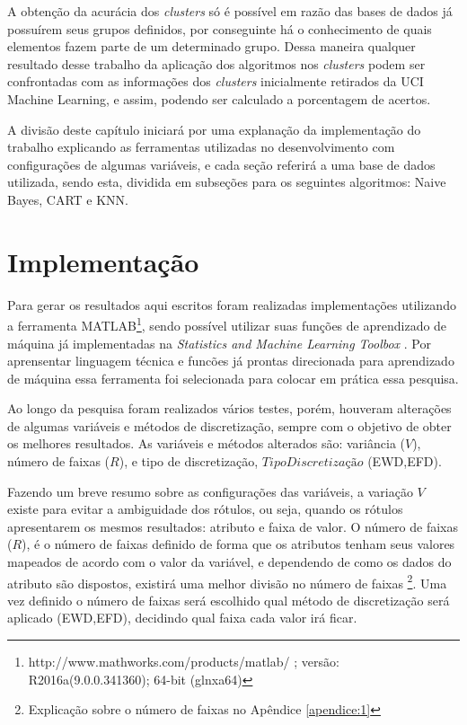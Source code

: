 A obtenção da acurácia dos \textit{clusters} só é possível em razão das bases de dados já possuírem seus grupos definidos, por conseguinte há o conhecimento de quais elementos fazem parte de um determinado grupo. Dessa maneira qualquer resultado desse trabalho da aplicação dos algoritmos nos \textit{clusters} podem ser confrontadas com as informações dos \textit{clusters} inicialmente retirados da UCI Machine Learning, e assim, podendo ser calculado a porcentagem de acertos.

A divisão deste capítulo iniciará por uma explanação da implementação do trabalho explicando as ferramentas  utilizadas no desenvolvimento com configurações  de algumas variáveis, e cada seção referirá a uma base de dados utilizada, sendo esta, dividida em subseções para os seguintes algoritmos: Naive Bayes, CART e KNN.

\section{Implementação}\label{cap:resultados:sec:implement}

Para  gerar os resultados aqui escritos foram realizadas implementações utilizando a ferramenta MATLAB\footnote{http://www.mathworks.com/products/matlab/ ; versão: R2016a(9.0.0.341360); 64-bit (glnxa64)}, sendo possível utilizar suas funções de aprendizado de máquina já implementadas na \textit{Statistics and Machine Learning Toolbox }. Por aprensentar  linguagem técnica e funcões já prontas direcionada para aprendizado de máquina essa ferramenta foi selecionada para colocar em prática essa pesquisa.

Ao longo da pesquisa foram realizados vários testes, porém, houveram alterações de algumas variáveis e métodos de discretização, sempre com o objetivo de obter os melhores resultados. As variáveis e métodos alterados são: variância (${V}$), número de faixas (${R}$), e tipo de discretização, ${TipoDiscretização}$ (EWD,EFD). 

Fazendo um breve resumo sobre as configurações das variáveis, a variação ${V}$ existe para evitar a ambiguidade dos rótulos, ou seja, quando os rótulos apresentarem os mesmos resultados: atributo e faixa de valor. O número de faixas (${R}$), é o número de faixas definido de forma que os atributos tenham seus valores mapeados de acordo com o valor da variável, e dependendo de como os dados do atributo são dispostos, existirá uma melhor divisão no número de faixas \footnote{Explicação sobre o número de faixas no Apêndice \ref{apendice:1}}. Uma vez definido o número de faixas será escolhido qual método de discretização será aplicado (EWD,EFD), decidindo qual faixa cada valor irá ficar.  

